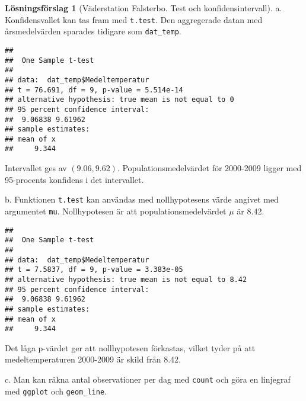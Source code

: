 \documentclass[
]{book}
\newenvironment{Shaded}{\begin{snugshade}}{\end{snugshade}}
\newcommand{\AttributeTok}[1]{\textcolor[rgb]{0.77,0.63,0.00}{#1}}
\newcommand{\FloatTok}[1]{\textcolor[rgb]{0.00,0.00,0.81}{#1}}
\newcommand{\FunctionTok}[1]{\textcolor[rgb]{0.00,0.00,0.00}{#1}}
\newcommand{\NormalTok}[1]{#1}
\newcommand{\SpecialCharTok}[1]{\textcolor[rgb]{0.00,0.00,0.00}{#1}}
\theoremstyle{definition}
\theoremstyle{definition}
\theoremstyle{definition}
\theoremstyle{definition}
\newtheorem{hypothesis}{Lösningsförslag}[chapter]
\theoremstyle{remark}
\begin{document}
\begin{hypothesis}[Väderstation Falsterbo. Test och konfidensintervall]
a. Konfidensvallet kan tas fram med \texttt{t.test}. Den aggregerade datan med årsmedelvärden sparades tidigare som \texttt{dat\_temp}.

\begin{Shaded}
\end{Shaded}

\begin{verbatim}
## 
##  One Sample t-test
## 
## data:  dat_temp$Medeltemperatur
## t = 76.691, df = 9, p-value = 5.514e-14
## alternative hypothesis: true mean is not equal to 0
## 95 percent confidence interval:
##  9.06838 9.61962
## sample estimates:
## mean of x 
##     9.344
\end{verbatim}

Intervallet ges av \((9.06, 9.62)\). Populationsmedelvärdet för 2000-2009 ligger med 95-procents konfidens i det intervallet.

b. Funktionen \texttt{t.test} kan användas med nollhypotesens värde angivet med argumentet \texttt{mu}. Nollhypotesen är att populationsmedelvärdet \(\mu\) är 8.42.

\begin{Shaded}
\end{Shaded}

\begin{verbatim}
## 
##  One Sample t-test
## 
## data:  dat_temp$Medeltemperatur
## t = 7.5837, df = 9, p-value = 3.383e-05
## alternative hypothesis: true mean is not equal to 8.42
## 95 percent confidence interval:
##  9.06838 9.61962
## sample estimates:
## mean of x 
##     9.344
\end{verbatim}

Det låga p-värdet ger att nollhypotesen förkastas, vilket tyder på att medeltemperaturen 2000-2009 är skild från 8.42.

c. Man kan räkna antal observationer per dag med \texttt{count} och göra en linjegraf med \texttt{ggplot} och \texttt{geom\_line}.


\end{hypothesis}
\end{document}
